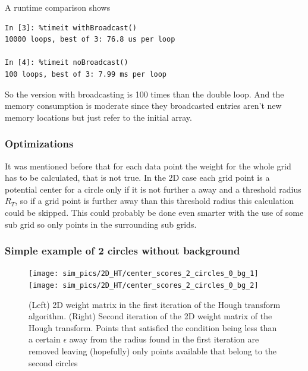 \documentclass[11pt,twoside]{scrreprt}
\begin{document}
%
\begin{minipage}{\linewidth}
A runtime comparison shows   
\begin{lstlisting}
In [3]: %timeit withBroadcast()
10000 loops, best of 3: 76.8 us per loop

In [4]: %timeit noBroadcast()
100 loops, best of 3: 7.99 ms per loop
\end{lstlisting}
So the version with broadcasting is 100 times than the double loop. And the memory consumption is moderate since they broadcasted entries aren't new memory locations but just refer to the initial array.
\end{minipage}


\subsubsection{Optimizations} %
\label{ssub:optimizations}
It was mentioned before that for each data point the weight for the whole grid has to be calculated, that is not true. In the 2D case each grid point is a potential center for a circle only if it is not further a away and a threshold radius $R_T$, so if a grid point is further away than this threshold radius this calculation could be skipped. This could probably be done even smarter with the use of some sub grid so only points in the surrounding sub grids.


\subsubsection{Simple example of 2 circles without background} %
\label{ssub:simple_example_of_2_circles_without_background}
\begin{figure}[hp]
  \centering
  \texttt{[image: sim\_pics/2D\_HT/center\_scores\_2\_circles\_0\_bg\_1]}%
  \texttt{[image: sim\_pics/2D\_HT/center\_scores\_2\_circles\_0\_bg\_2]}

  \caption[2D weight matrix, first iteration]{(Left) 2D weight matrix in the first iteration of the Hough transform algorithm. (Right) Second iteration
  of the 2D weight matrix of the Hough transform. Points that satisfied the condition being less than a certain $\epsilon$ away from the radius found in the first iteration are removed leaving (hopefully) only points available that belong to the second circles}
  \label{fig:2d_weights_01}
\end{figure}
\end{document}

